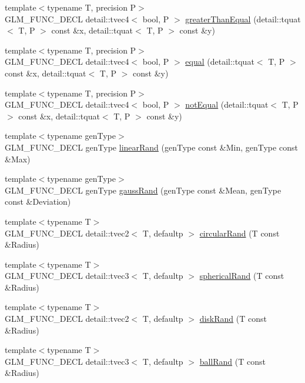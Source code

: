 \begin{CompactItemize}
\item 
{\footnotesize template$<$typename T, precision P$>$ }\\GLM\_\-FUNC\_\-DECL detail::tvec4$<$ bool, P $>$ \hyperlink{group__gtc__quaternion_ge52fe15caa6daaf39c02a5d5827f8473}{greaterThanEqual} (detail::tquat$<$ T, P $>$ const \&x, detail::tquat$<$ T, P $>$ const \&y)
\item 
{\footnotesize template$<$typename T, precision P$>$ }\\GLM\_\-FUNC\_\-DECL detail::tvec4$<$ bool, P $>$ \hyperlink{group__gtc__quaternion_gd867dac3fe25c96ee0cc95a141acd4db}{equal} (detail::tquat$<$ T, P $>$ const \&x, detail::tquat$<$ T, P $>$ const \&y)
\item 
{\footnotesize template$<$typename T, precision P$>$ }\\GLM\_\-FUNC\_\-DECL detail::tvec4$<$ bool, P $>$ \hyperlink{group__gtc__quaternion_g5299d50f9c7692d388f1275cff4e89ce}{notEqual} (detail::tquat$<$ T, P $>$ const \&x, detail::tquat$<$ T, P $>$ const \&y)
\item 
{\footnotesize template$<$typename genType$>$ }\\GLM\_\-FUNC\_\-DECL genType \hyperlink{group__gtc__random_gb955b990407d8d4b62cfe2a2a89d9492}{linearRand} (genType const \&Min, genType const \&Max)
\item 
{\footnotesize template$<$typename genType$>$ }\\GLM\_\-FUNC\_\-DECL genType \hyperlink{group__gtc__random_gc045638daf634b0221ef4baaaf643cb2}{gaussRand} (genType const \&Mean, genType const \&Deviation)
\item 
{\footnotesize template$<$typename T$>$ }\\GLM\_\-FUNC\_\-DECL detail::tvec2$<$ T, defaultp $>$ \hyperlink{group__gtc__random_gb633996dfedab1a7f45bb5cfa1b14443}{circularRand} (T const \&Radius)
\item 
{\footnotesize template$<$typename T$>$ }\\GLM\_\-FUNC\_\-DECL detail::tvec3$<$ T, defaultp $>$ \hyperlink{group__gtc__random_g02f5a6b98ae4e494eef340bcdd38ed35}{sphericalRand} (T const \&Radius)
\item 
{\footnotesize template$<$typename T$>$ }\\GLM\_\-FUNC\_\-DECL detail::tvec2$<$ T, defaultp $>$ \hyperlink{group__gtc__random_gea707507f941467133dfdd4f3de9eeed}{diskRand} (T const \&Radius)
\item 
{\footnotesize template$<$typename T$>$ }\\GLM\_\-FUNC\_\-DECL detail::tvec3$<$ T, defaultp $>$ \hyperlink{group__gtc__random_g8543dd05af529c33cb10deb832aab03a}{ballRand} (T const \&Radius)

\end{CompactItemize}
